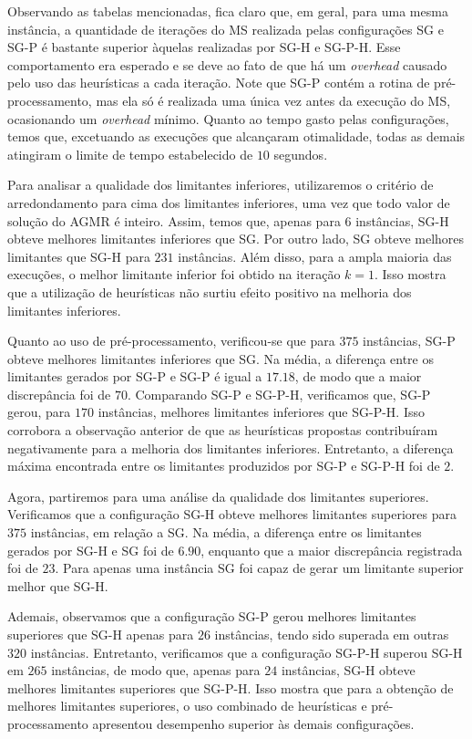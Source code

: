 \documentclass[12pt, a4paper]{article}
\theoremstyle{plain}
\theoremstyle{definition}
\theoremstyle{remark}
\begin{document}
Observando as tabelas mencionadas, fica claro que, em geral, para uma mesma instância, a quantidade de iterações do MS realizada pelas configurações SG e SG-P é bastante superior àquelas realizadas por SG-H e SG-P-H. Esse comportamento era esperado e se deve ao fato de que há um \textit{overhead} causado pelo uso das heurísticas a cada iteração. Note que SG-P contém a rotina de pré-processamento, mas ela só é realizada uma única vez antes da execução do MS, ocasionando um \textit{overhead} mínimo. Quanto ao tempo gasto pelas configurações, temos que, excetuando as execuções que alcançaram otimalidade, todas as demais atingiram o limite de tempo estabelecido de $10$ segundos.

Para analisar a qualidade dos limitantes inferiores, utilizaremos o critério de arredondamento para cima dos limitantes inferiores, uma vez que todo valor de solução do AGMR é inteiro. Assim, temos que, apenas para $6$ instâncias, SG-H obteve melhores limitantes inferiores que SG. Por outro lado, SG obteve melhores limitantes que SG-H para $231$ instâncias. Além disso, para a ampla maioria das execuções, o melhor limitante inferior foi obtido na iteração $k = 1$. Isso mostra que a utilização de heurísticas não surtiu efeito positivo na melhoria dos limitantes inferiores.

Quanto ao uso de pré-processamento, verificou-se que para $375$ instâncias, SG-P obteve melhores limitantes inferiores que SG. Na média, a diferença entre os limitantes gerados por SG-P e SG-P é igual a $17.18$, de modo que a maior discrepância foi de $70$. Comparando SG-P e SG-P-H, verificamos que, SG-P gerou, para $170$ instâncias, melhores limitantes inferiores que SG-P-H. Isso corrobora a observação anterior de que as heurísticas propostas contribuíram negativamente para a melhoria dos limitantes inferiores. Entretanto, a diferença máxima encontrada entre os limitantes produzidos por SG-P e SG-P-H foi de $2$.

Agora, partiremos para uma análise da qualidade dos limitantes superiores. Verificamos que a configuração SG-H obteve melhores limitantes superiores para $375$ instâncias, em relação a SG. Na média, a diferença entre os limitantes gerados por SG-H e SG foi de $6.90$, enquanto que a maior discrepância registrada foi de $23$. Para apenas uma instância SG foi capaz de gerar um limitante superior melhor que SG-H.

Ademais, observamos que a configuração SG-P gerou melhores limitantes superiores que SG-H apenas para $26$ instâncias, tendo sido superada em outras $320$ instâncias. Entretanto, verificamos que a configuração SG-P-H superou SG-H em $265$ instâncias, de modo que, apenas para $24$ instâncias, SG-H obteve melhores limitantes superiores que SG-P-H. Isso mostra que para a obtenção de melhores limitantes superiores, o uso combinado de heurísticas e pré-processamento apresentou desempenho superior às demais configurações.
\end{document}

